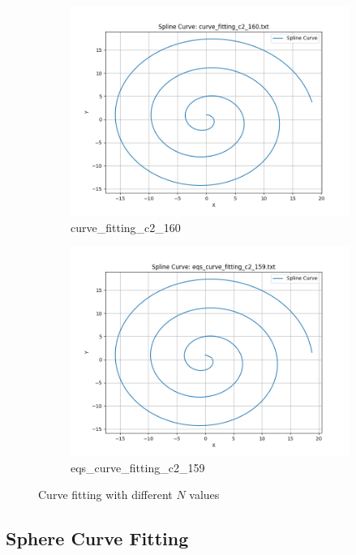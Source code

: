 \documentclass[a4paper]{article}
\begin{document}
\begin{figure}[htbp]
\begin{subfigure}[t]{0.24\textwidth}
      \includegraphics[width=\textwidth]{figures/E/curve_fitting_c2_160.png}
      \caption*{curve\_fitting\_c2\_160}
  \end{subfigure}
  \begin{subfigure}[t]{0.24\textwidth}
      \centering
      \includegraphics[width=\textwidth]{figures/E/eqs_curve_fitting_c2_159.png}
      \caption*{eqs\_curve\_fitting\_c2\_159}
  \end{subfigure}
  \caption{Curve fitting with different $N$ values}
  \label{fig:curve_fitting}
\end{figure}

\newpage

\subsection*{Sphere Curve Fitting}
\end{document}
